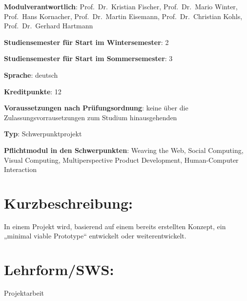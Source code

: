 \begin{modulHead}
\textbf{Modulverantwortlich}: Prof.~Dr.~Kristian
Fischer, Prof.~Dr.~Mario Winter, Prof.~Hans Kornacher, Prof.~Dr.~Martin
Eisemann, Prof.~Dr.~Christian Kohls, Prof.~Dr.~Gerhard
Hartmann
\end{modulHead}
\begin{modulHead}
\textbf{Studiensemester für
Start im Wintersemester}:
2
\end{modulHead}
\begin{modulHead}
\textbf{Studiensemester für Start
im Sommersemester}:
3
\end{modulHead}
\begin{modulHead}
\textbf{Sprache}:
deutsch
\end{modulHead}
\begin{modulHead}
\textbf{Kreditpunkte}:
12
\end{modulHead}
\begin{modulHead}
\textbf{Voraussetzungen nach
Prüfungsordnung}: keine über die Zulassungsvorrausetzungen zum Studium
hinausgehenden
\end{modulHead}
\begin{modulHead}
\textbf{Typ}:
Schwerpunktprojekt
\end{modulHead}
\begin{modulHead}
\textbf{Pflichtmodul
in den Schwerpunkten}: Weaving the Web, Social Computing, Visual
Computing, Multiperspective Product Development, Human-Computer
Interaction
\end{modulHead}


\section*{Kurzbeschreibung:\label{/mi-2017/modulbeschreibungen-master/MA_Modul_Projekt_Entwicklung}}\label{kurzbeschreibungpathlabelmi-2017modulbeschreibungen-mastermaux5fmodulux5fprojektux5fentwicklung}

In einem Projekt wird, basierend auf einem bereits erstellten Konzept,
ein „minimal viable Prototype`` entwickelt oder weiterentwickelt.

\section*{Lehrform/SWS:\label{/mi-2017/modulbeschreibungen-master/MA_Modul_Projekt_Entwicklung}}\label{lehrformswspathlabelmi-2017modulbeschreibungen-mastermaux5fmodulux5fprojektux5fentwicklung}

Projektarbeit

